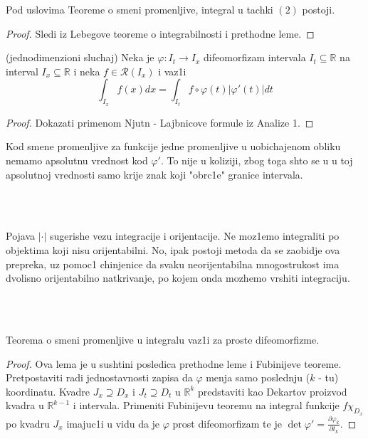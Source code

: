 \documentclass[a4paper,12pt]{article}
\newcommand{\RR}{\mathbb{R}}
\begin{document}
\begin{posl}
Pod uslovima Teoreme o smeni promenljive, integral u tachki $(2)$ postoji.
\end{posl}
\begin{proof}
Sledi iz Lebegove teoreme o integrabilnosti i prethodne leme.
\end{proof}

\begin{lema} (jednodimenzioni sluchaj) Neka je $\varphi: I_t \to I_x$ difeomorfizam intervala $I_t \subseteq \RR$ na interval $I_x \subseteq \RR$ i neka $f \in \mathcal R (I_x)$ i vaz1i 
\[\int_{I_x} f(x) dx = \int_{I_t} f \circ \varphi(t) | \varphi ' (t)| dt\]
\end{lema}

\begin{proof}
Dokazati primenom Njutn - Lajbnicove formule iz Analize 1.
\end{proof}

\begin{nap}
Kod smene promenljive za funkcije jedne promenljive u uobichajenom obliku nemamo apsolutnu vrednost kod $\varphi '$. To nije u koliziji, zbog toga shto se u u toj apsolutnoj vrednosti samo krije znak koji "obrc1e" granice intervala.
\end{nap}
\\ \\
\begin{nap}
Pojava $|\cdot|$ sugerishe vezu integracije i orijentacije. Ne moz1emo integraliti po objektima koji nisu orijentabilni. No, ipak postoji metoda da
se zaobidje ova prepreka, uz pomoc1 chinjenice da svaku neorijentabilna mnogostrukost ima dvolisno orijentabilno natkrivanje, po kojem onda
mozhemo vrshiti integraciju.
\end{nap}
\\ \\
\begin{lema}
Teorema o smeni promenljive u integralu vaz1i za proste difeomorfizme.
\end{lema}
\begin{proof}
Ova lema je u sushtini posledica prethodne leme i Fubinijeve teoreme. Pret\-po\-sta\-vi\-ti radi jednostavnosti zapisa da $\varphi$ menja samo poslednju ($k$ - tu) koordinatu. Kvadre $J_x \supseteq D_x$ i $J_t \supseteq D_t$ u $\RR^k$ predstaviti kao Dekartov proizvod kvadra u $\RR^{k-1}$ i intervala. Primeniti Fubinijevu teoremu na integral funkcije $f \chi_{D_x}$ po kvadru $J_x$ imajuc1i u vidu da je $\varphi$ prost difeomorfizam te je $\det \varphi ' = \frac{\partial \varphi_k}{\partial t_k}$.
\end{proof}
\end{document}
